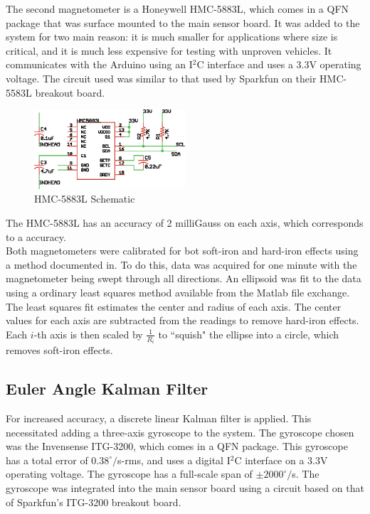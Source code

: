  The second magnetometer is a Honeywell HMC-5883L, which comes in a QFN package that was surface mounted to the main sensor board. It was added to the system for two main reason: it is much smaller for applications where size is critical, and it is much less expensive for testing with unproven vehicles. It communicates with the Arduino using an I$^2$C interface and uses a 3.3V operating voltage\cite{hmc5883LDatasheet}. The circuit used was similar to that used by Sparkfun on their HMC-5583L breakout board\cite{hmc5883LSchematic}.
 
 \begin{figure}[h!]
   \caption{HMC-5883L Schematic} \label{hmc5883LSchematic}
   \centering
     \includegraphics[width=0.5\textwidth]{figures/hmc5883LSchematic.eps}
 \end{figure}
 
 The HMC-5883L has an accuracy of 2 milliGauss on each axis, which corresponds to a accuracy.\\

 Both magnetometers were calibrated for bot soft-iron and hard-iron effects using a method documented in\cite{magCalibration}.
 To do this, data was acquired for one minute with the magnetometer being swept through all directions. An ellipsoid was fit to the data using a ordinary least squares method available from the Matlab file exchange\cite{ellipsoidFit}.
 The least squares fit estimates the center and radius of each axis. The center values for each axis are subtracted from the readings to remove hard-iron effects. Each $i$-th axis is then scaled by $\frac{1}{R_i}$ to ``squish" the ellipse into a circle, which removes soft-iron effects.
\subsection*{Euler Angle Kalman Filter}
For increased accuracy, a discrete linear Kalman filter is applied. This necessitated adding a three-axis gyroscope to the system. The gyroscope chosen was the Invensense ITG-3200, which comes in a QFN package. This gyroscope has a total error of $0.38^\circ/$s-rms\cite{itg3200DataSheet}, and uses a digital I$^2$C interface on a 3.3V operating voltage. The gyroscope has a full-scale span of $\pm2000^\circ/$s. The gyroscope was integrated into the main sensor board using a circuit based on that of Sparkfun's ITG-3200 breakout board\cite{itg3200BOBSchematic}.


